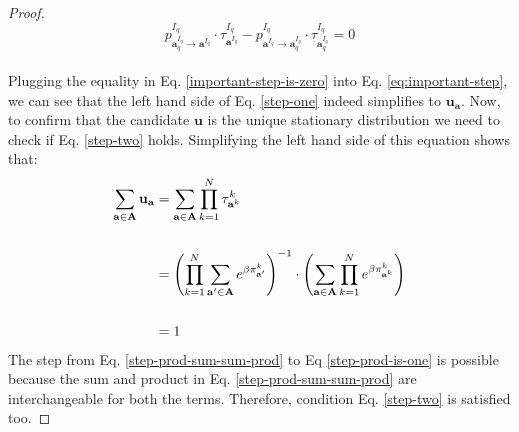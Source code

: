 \documentclass[11pt]{article}
\theoremstyle{plainCl1}
\theoremstyle{plainCl2}
\newcommand{\A}{\mathbf{A}}
\newcommand{\abf}{\mathbf{a}}
\newcommand{\ubf}{\mathbf{u}}
\begin{document}
\begin{proof}
\begin{equation}
p^{I_q}_{\abf^{I_q}_q \to \abf^{I_q}} \cdot \tau^{I_q}_{\abf^{I_q}} -  p^{I_q}_{\abf^{I_q} \to \abf^{I_q}_q} \cdot \tau^{I_q}_{\abf^{I_q}_q} = 0
\label{important-step-is-zero}
\end{equation}
\\ \noindent Plugging the equality in Eq. \ref{important-step-is-zero} into Eq. \ref{eq:important-step}, we can see that the left hand side of Eq. \ref{step-one} indeed simplifies to $\ubf_{\abf}$. Now, to confirm that the candidate $\ubf$ is the unique stationary distribution we need to check if Eq. \ref{step-two} holds. Simplifying the left hand side of this equation shows that:
\begin{align}
\sum_{\abf \in \A} \ubf_\abf &= \sum_{\abf \in \A} \prod_{k=1}^N \tau^k_{\abf^k} \\ \notag \\
\label{step-prod-sum-sum-prod}
&= \left( \prod_{k=1}^N \sum_{\abf' \in \A} \displaystyle e^{\beta \pi^k_{\abf'}}\right)^{-1} \cdot \left( \sum_{\abf \in \A} \prod_{k=1}^N \displaystyle e^{\beta \pi^k_{\abf^k}} \right) \\ \notag \\
\label{step-prod-is-one}
&= 1
\end{align}
\noindent The step from Eq. \ref{step-prod-sum-sum-prod} to Eq \ref{step-prod-is-one} is possible because the sum and product in Eq. \ref{step-prod-sum-sum-prod} are interchangeable for both the terms. Therefore, condition Eq. \ref{step-two} is satisfied too. 
\end{proof}
\end{document}
